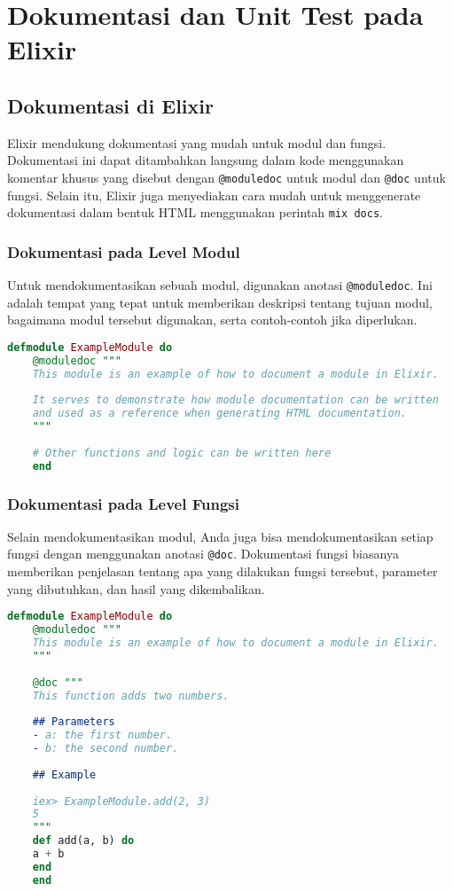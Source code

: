 \chapter{Dokumentasi dan Unit Test pada Elixir}


\section{Dokumentasi di Elixir}

Elixir mendukung dokumentasi yang mudah untuk modul dan fungsi. Dokumentasi ini dapat ditambahkan langsung dalam kode menggunakan komentar khusus yang disebut dengan \texttt{@moduledoc} untuk modul dan \texttt{@doc} untuk fungsi. Selain itu, Elixir juga menyediakan cara mudah untuk menggenerate dokumentasi dalam bentuk HTML menggunakan perintah \texttt{mix docs}.


\subsection{Dokumentasi pada Level Modul}

Untuk mendokumentasikan sebuah modul, digunakan anotasi \texttt{@moduledoc}. Ini adalah tempat yang tepat untuk memberikan deskripsi tentang tujuan modul, bagaimana modul tersebut digunakan, serta contoh-contoh jika diperlukan.

\begin{lstlisting}[language=Elixir]
	defmodule ExampleModule do
	@moduledoc """
	This module is an example of how to document a module in Elixir.
	
	It serves to demonstrate how module documentation can be written
	and used as a reference when generating HTML documentation.
	"""
	
	# Other functions and logic can be written here
	end
\end{lstlisting}

\subsection{Dokumentasi pada Level Fungsi}

Selain mendokumentasikan modul, Anda juga bisa mendokumentasikan setiap fungsi dengan menggunakan anotasi \texttt{@doc}. Dokumentasi fungsi biasanya memberikan penjelasan tentang apa yang dilakukan fungsi tersebut, parameter yang dibutuhkan, dan hasil yang dikembalikan.

\begin{lstlisting}[language=Elixir]
	defmodule ExampleModule do
	@moduledoc """
	This module is an example of how to document a module in Elixir.
	"""
	
	@doc """
	This function adds two numbers.
	
	## Parameters
	- a: the first number.
	- b: the second number.
	
	## Example
	
	iex> ExampleModule.add(2, 3)
	5
	"""
	def add(a, b) do
	a + b
	end
	end
\end{lstlisting}

